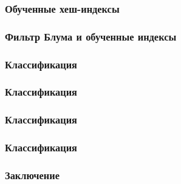 \documentclass{bmstu-pr}
\begin{document}
\begin{frame}
    \frametitle{Обученные хеш-индексы}
    \centering{}
\end{frame}

\begin{frame}
    \frametitle{Фильтр Блума и обученные индексы}
\end{frame}

\begin{frame}
    \frametitle{Классификация}
\end{frame}

\begin{frame}
    \frametitle{Классификация}
\end{frame}

\begin{frame}
    \frametitle{Классификация}
\end{frame}

\begin{frame}
    \frametitle{Классификация}
\end{frame}

\begin{frame}
    \frametitle{Заключение}
\end{frame}
\end{document}
